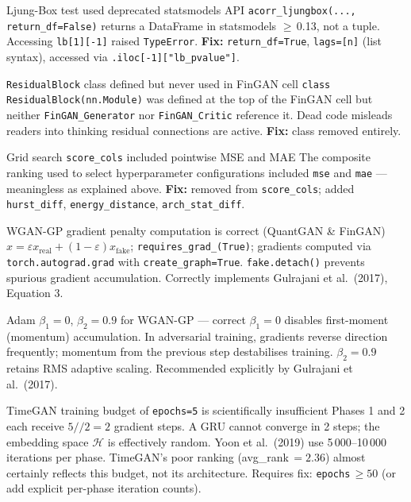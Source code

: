 \documentclass[10pt]{article}
\begin{document}
%
  {Ljung-Box test used deprecated statsmodels API}%
  {\texttt{acorr\_ljungbox(..., return\_df=False)} returns a DataFrame in statsmodels $\geq$\,0.13, not a tuple. Accessing \texttt{lb[1][-1]} raised \texttt{TypeError}. \textbf{Fix:} \texttt{return\_df=True}, \texttt{lags=[n]} (list syntax), accessed via \texttt{.iloc[-1]["lb\_pvalue"]}.}

%
  {\texttt{ResidualBlock} class defined but never used in FinGAN cell}%
  {\texttt{class ResidualBlock(nn.Module)} was defined at the top of the FinGAN cell but neither \texttt{FinGAN\_Generator} nor \texttt{FinGAN\_Critic} reference it. Dead code misleads readers into thinking residual connections are active. \textbf{Fix:} class removed entirely.}

%
  {Grid search \texttt{score\_cols} included pointwise MSE and MAE}%
  {The composite ranking used to select hyperparameter configurations included \texttt{mse} and \texttt{mae} --- meaningless as explained above. \textbf{Fix:} removed from \texttt{score\_cols}; added \texttt{hurst\_diff}, \texttt{energy\_distance}, \texttt{arch\_stat\_diff}.}

%
  {WGAN-GP gradient penalty computation is correct (QuantGAN \& FinGAN)}%
  {$\hat{x} = \varepsilon x_\text{real} + (1-\varepsilon)x_\text{fake}$; \texttt{requires\_grad\_(True)}; gradients computed via \texttt{torch.autograd.grad} with \texttt{create\_graph=True}. \texttt{fake.detach()} prevents spurious gradient accumulation. Correctly implements Gulrajani et al.\ (2017), Equation 3.}

%
  {Adam $\beta_1=0$, $\beta_2=0.9$ for WGAN-GP --- correct}%
  {$\beta_1=0$ disables first-moment (momentum) accumulation. In adversarial training, gradients reverse direction frequently; momentum from the previous step destabilises training. $\beta_2=0.9$ retains RMS adaptive scaling. Recommended explicitly by Gulrajani et al.\ (2017).}

%
  {TimeGAN training budget of \texttt{epochs=5} is scientifically insufficient}%
  {Phases 1 and 2 each receive $5//2=2$ gradient steps. A GRU cannot converge in 2 steps; the embedding space $\mathcal{H}$ is effectively random. Yoon et al.\ (2019) use 5\,000--10\,000 iterations per phase. TimeGAN's poor ranking (avg\_rank\,$=2.36$) almost certainly reflects this budget, not its architecture. Requires fix: \texttt{epochs}\,$\geq 50$ (or add explicit per-phase iteration counts).}
\end{document}
